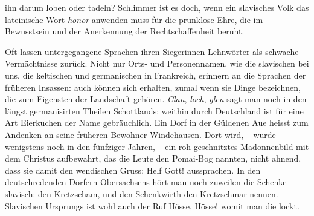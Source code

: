 {ihn darum loben oder tadeln? Schlimmer ist es doch, wenn ein slavisches Volk das lateinische Wort \textit{honor} anwenden muss für die prunklose Ehre, die im Bewusstsein und der Anerkennung der Rechtschaffenheit beruht.

Oft lassen untergegangene Sprachen ihren Siegerinnen Lehnwörter als schwache Vermächtnisse zurück. Nicht nur Orts- und Personennamen, wie die slavischen bei uns, die keltischen und germanischen in Frankreich, erinnern an die Sprachen der früheren Insassen: auch  können sich erhalten, zumal wenn sie Dinge bezeichnen, die zum Eigensten der Landschaft gehören. \textit{Clan}, \textit{loch}, \textit{glen} sagt man noch in den längst germanisirten Theilen Schottlands; weithin durch Deutschland ist für eine Art Eierkuchen der  Name  gebräuchlich.  Ein Dorf in der Güldenen Aue heisst zum Andenken an seine früheren Bewohner Windehausen. Dort wird, – wurde wenigstens noch in den fünfziger Jahren, – ein roh geschnitztes Madonnenbild mit dem Christus aufbewahrt, das die Leute den Pomai-Bog nannten, nicht ahnend, dass sie damit den wendischen Gruss: Helf Gott! aussprachen. In den deutsch\-\label{fp.261}redenden Dörfern Obersachsens hört man noch zuweilen die Schenke slavisch: den Kretzscham, und den Schenkwirth den Kretzschmar nennen. Slavischen Ursprungs ist wohl auch der Ruf Hösse, Hösse! womit man die   lockt. 

}
